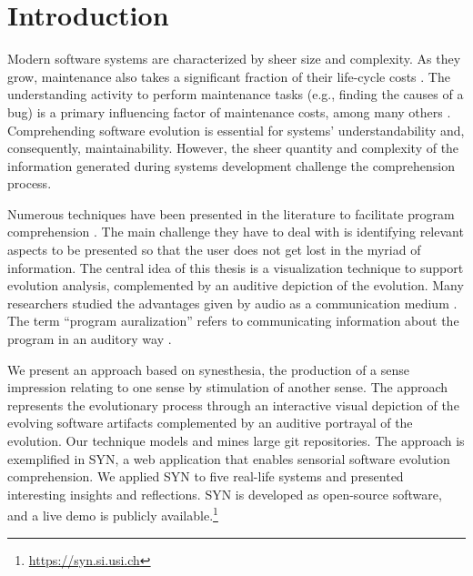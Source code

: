 \documentclass[11pt,twoside,english,singlespacing,headsepline,consistentlayout]{auxiliary/si-msc-thesis}
\author{Gianlorenzo Occhipinti}
\newcommand{\quotes}[1]{``#1''}
\begin{document}
\frontmatter
\pagestyle{plain}




\mainmatter
 
\pagestyle{thesis} 



\section*{Introduction}
Modern software systems are characterized by sheer size and complexity. As they grow, maintenance also takes a significant fraction of their life-cycle costs \cite{Davis1995, Sommerville1995, Erlikh2000, seacord2003}. The understanding activity to perform maintenance tasks (e.g., finding the causes of a bug) is a primary influencing factor of maintenance costs, among many others \cite{Corbi1989}.
Comprehending software evolution is essential for systems' understandability and, consequently, maintainability. However, the sheer quantity and complexity of the information generated during systems development challenge the comprehension process.

Numerous techniques have been presented in the literature to facilitate program comprehension \cite{Lanza2001, DAmbros2006, Steinbrueckner2010, Wettel2011, Alexandru2019, SoftwareEvolution}. The main challenge they have to deal with is identifying relevant aspects to be presented so that the user does not get lost in the myriad of information. 
The central idea of this thesis is a visualization technique to support evolution analysis, complemented by an auditive depiction of the evolution. 
Many researchers studied the advantages given by audio as a communication medium \cite{Alty1995, Vickers2004, Boccuzzo2009, McIntosh2014, Mancino2017}.
The term \quotes{program auralization} refers to communicating information about the program in an auditory way \cite{DiGiano1992}.

We present an approach based on synesthesia, the production of a sense impression relating to one sense by stimulation of another sense. The approach represents the evolutionary process through an interactive visual depiction of the evolving software artifacts complemented by an auditive portrayal of the evolution. Our technique models and mines large git repositories.
The approach is exemplified in SYN, a web application that enables sensorial software evolution comprehension.
We applied SYN to five real-life systems and presented interesting insights and reflections. SYN is developed as open-source software, and a live demo is publicly available.\footnote{\url{https://syn.si.usi.ch}}
\end{document}
